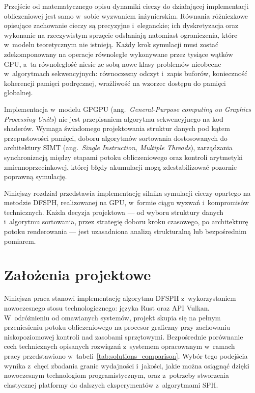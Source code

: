 Przejście od matematycznego opisu dynamiki cieczy do działającej implementacji
obliczeniowej jest samo w~sobie wyzwaniem inżynierskim. Równania różniczkowe
opisujące zachowanie cieczy są precyzyjne i~eleganckie; ich dyskretyzacja oraz
wykonanie na rzeczywistym sprzęcie odsłaniają natomiast ograniczenia, które
w~modelu teoretycznym nie istnieją. Każdy krok symulacji musi zostać
zdekomponowany na operacje równoległe wykonywane przez tysiące wątków GPU,
a~ta równoległość niesie ze sobą nowe klasy problemów nieobecne w~algorytmach
sekwencyjnych: równoczesny odczyt i~zapis buforów, konieczność koherencji
pamięci podręcznej, wrażliwość na wzorzec dostępu do pamięci globalnej.

Implementacja w~modelu GPGPU (ang.~\textit{General-Purpose computing on Graphics Processing Units}) 
nie jest przepisaniem algorytmu sekwencyjnego
na kod shaderów. Wymaga świadomego projektowania struktur danych pod kątem
przepustowości pamięci, doboru algorytmów sortowania dostosowanych do
architektury SIMT (ang.~\textit{Single Instruction, Multiple Threads}), 
zarządzania synchronizacją między etapami potoku
obliczeniowego oraz kontroli arytmetyki zmiennoprzecinkowej, której błędy
akumulacji mogą zdestabilizować pozornie poprawną symulację.

Niniejszy rozdział przedstawia implementację silnika symulacji cieczy opartego
na metodzie DFSPH, realizowanej na GPU, w~formie ciągu wyzwań i~kompromisów
technicznych. Każda decyzja projektowa --- od wyboru struktury danych
i~algorytmu sortowania, przez strategię doboru kroku czasowego, po architekturę
potoku renderowania --- jest uzasadniona analizą strukturalną lub bezpośrednim
pomiarem.

\section{Założenia projektowe}
\label{sec:assumptions}

Niniejsza praca stanowi implementację algorytmu DFSPH z~wykorzystaniem nowoczesnego stosu technologicznego:
języka Rust oraz API Vulkan. W~odróżnieniu od omawianych systemów, projekt skupia się na pełnym przeniesieniu
potoku obliczeniowego na procesor graficzny przy zachowaniu niskopoziomowej kontroli nad zasobami sprzętowymi.
Bezpośrednie porównanie cech technicznych opisanych rozwiązań z~systemem opracowanym w~ramach pracy przedstawiono
w~tabeli~\ref{tab:solutions_comparison}. Wybór tego podejścia wynika z~chęci zbadania granic wydajności i~jakości,
jakie można osiągnąć dzięki nowoczesnym technologiom programistycznym, oraz z~potrzeby stworzenia elastycznej
platformy do dalszych eksperymentów z~algorytmami SPH.

